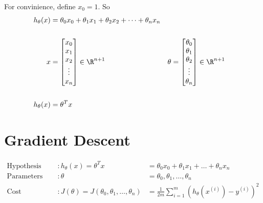 For convinience, define $x_0 = 1$. So
\begin{align*}
    h_\theta(x) & = \theta_0x_0	+ \theta_1x_1 + \theta_2x_2 + \dots + \theta_nx_n   \\
    \\
    x           & = \begin{bmatrix}
        x_0    \\
        x_1    \\
        x_2    \\
        \vdots \\
        x_n    \\
    \end{bmatrix} \in \R^{n+1}                       &
    \theta      & = \begin{bmatrix}
        \theta_0 \\
        \theta_1 \\
        \theta_2 \\
        \vdots   \\
        \theta_n \\
    \end{bmatrix} \in \R^{n+1}                         \\
    \\
    h_\theta(x) & = \theta^Tx                                                      \\
\end{align*}

\section{Gradient Descent}

\begin{align*}
    \text{Hypothesis}    & :  h_\theta(x) = \theta^Tx
                         & = \theta_0x_0 + \theta_1x_1 + \dots + \theta_nx_n        \\
    \text{Parameters}    & : \theta
                         & =\theta_0, \theta_1, \dots, \theta_n                     \\
    \text{Cost Function} & : J(\theta) = J(\theta_0, \theta_1, \dots, \theta_n)
                         & =\frac{1}{2m}\sum_{i=1}^m(h_\theta(x^{(i)}) - y^{(i)})^2 \\
\end{align*}
